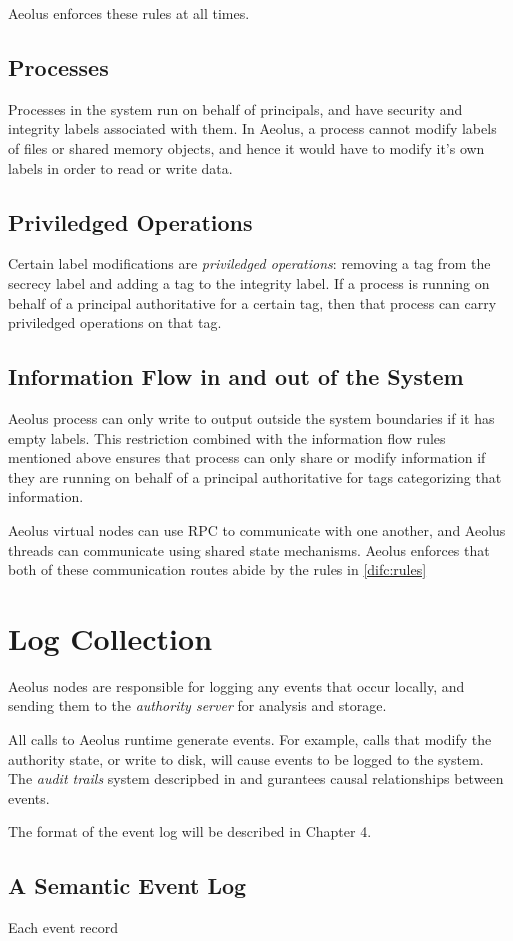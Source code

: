 Aeolus enforces these rules at all times.

\subsection{Processes}

Processes in the system run on behalf of principals, and have security and integrity labels associated with them. In Aeolus, a process cannot modify labels of files or shared memory objects, and hence it would have to modify it's own labels in order to read or write data.

\subsection{Priviledged Operations}

Certain label modifications are \emph{priviledged operations}: removing a tag from the secrecy label and adding a tag to the integrity label. If a process is running on behalf of a principal authoritative for a certain tag, then that process can carry priviledged operations on that tag.

\subsection{Information Flow in and out of the System}

Aeolus process can only write to output outside the system boundaries if it has empty labels. This restriction combined with the information flow rules mentioned above ensures that process can only share or modify information if they are running on behalf of a principal authoritative for tags categorizing that information.

Aeolus virtual nodes can use RPC to communicate with one another, and Aeolus threads can communicate using shared state mechanisms. Aeolus enforces that both of these communication routes abide by the rules in \ref{difc:rules}

\section{Log Collection}

Aeolus nodes are responsible for logging any events that occur locally, and sending them to the \emph{authority server} for analysis and storage.

All calls to Aeolus runtime generate events. For example, calls that modify the authority state, or write to disk, will cause events to be logged to the system. The \emph{audit trails} system descripbed in \cite{popic} and \cite{blanks} gurantees causal relationships between events.

The format of the event log will be described in Chapter 4.

\subsection{A Semantic Event Log}

Each event record 

